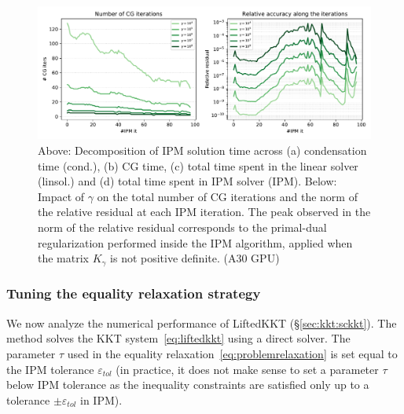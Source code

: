 \begin{figure}[!ht]
  \centering
  \includegraphics[width=\textwidth]{../figures/hybrid-gamma.pdf}
  \caption{
    Above: Decomposition of IPM solution time across
    (a) condensation time (cond.), (b) CG time, (c) total time
    spent in the linear solver (linsol.) and (d) total time spent in
    IPM solver (IPM).
    Below: Impact of $\gamma$ on the total number of CG iterations
    and the norm of the relative residual at each IPM iteration.
    The peak observed in the norm of the relative residual corresponds
    to the primal-dual regularization performed inside the IPM algorithm,
    applied when the matrix $K_\gamma$ is not positive definite.
    \label{fig:hybrid:gamma}
    (A30 GPU)
  }
\end{figure}


\subsubsection{Tuning the equality relaxation strategy}
We now analyze the numerical performance of LiftedKKT (\S\ref{sec:kkt:sckkt}).
The method solves the KKT system~\eqref{eq:liftedkkt} using a direct solver.
The parameter $\tau$ used in the equality relaxation~\eqref{eq:problemrelaxation}
is set equal to the IPM tolerance $\varepsilon_{tol}$ (in practice, it does not
make sense to set a parameter $\tau$ below IPM tolerance as the
inequality constraints are satisfied only up to a tolerance $\pm \varepsilon_{tol}$
in IPM).

